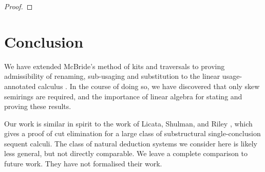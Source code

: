 \documentclass[submission,copyright,creativecommons]{eptcs}
\begin{document}
\begin{proof}
%
\end{proof}

\section{Conclusion}\label{sec:conclusion}

We have extended McBride's method of kits and traversals to proving
admissibility of renaming, sub-usaging and substitution to the linear
usage-annotated calculus \name{}. In the course of doing so, we have
discovered that only skew semirings are required, and the importance
of linear algebra for stating and proving these results.




Our work is similar in spirit to the work of Licata, Shulman, and
Riley \cite{LicataSR17}, which gives a proof of cut elimination for a
large class of substructural single-conclusion sequent calculi.  The
class of natural deduction systems we consider here is likely less
general, but not directly comparable. We leave a complete comparison
to future work. They have not formalised their work.
\end{document}
